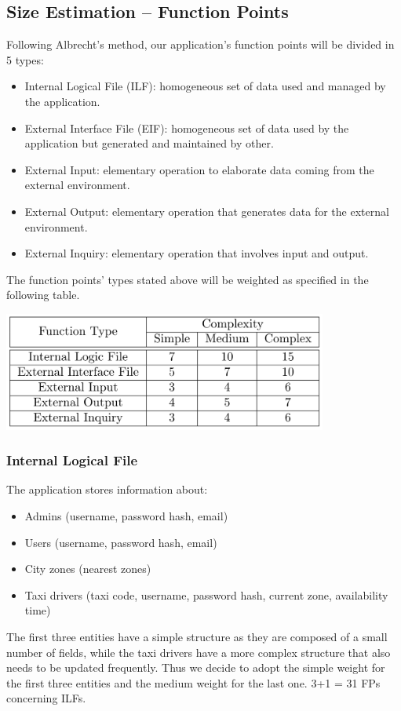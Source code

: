 \documentclass{article}
\begin{document}
\subsection{Size Estimation -- Function Points}
Following Albrecht's method, our application's function points
will be divided in 5 types:
\begin{itemize}
	\item Internal Logical File (ILF): homogeneous set of data used
	and managed by the application.
	\item External Interface File (EIF): homogeneous set of data 
	used by the application but generated and maintained by other.
	\item External Input: elementary operation to elaborate data
	coming from the external environment.
	\item External Output: elementary operation that generates data
	for the external environment.
	\item External Inquiry: elementary operation that involves
	input and output.
\end{itemize}
The function points' types stated above will be weighted as 
specified in the following table.
\begin{center}
	\includegraphics[width = 0.8\textwidth]{FP}
\end{center}
\subsubsection{Internal Logical File}
The application stores information about: 
\begin{itemize}
	\item Admins (username, password hash, email)
	\item Users (username, password hash, email)
	\item City zones (nearest zones)
	\item Taxi drivers (taxi code, username, password hash, current zone, availability time)
\end{itemize}
The first three entities have a simple structure as they are composed 
of a small number of fields, while the taxi drivers have a more complex
structure that also needs to be updated frequently. Thus we decide to 
adopt the simple weight for the first three entities and the medium weight
for the last one.
3+1 = 31 FPs concerning ILFs.
\end{document}
